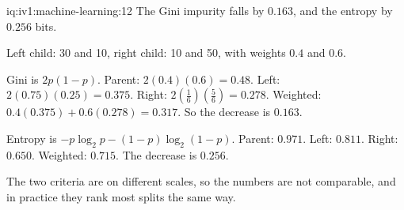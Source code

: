 \begin{solution}{iq:iv1:machine-learning:12}
The Gini impurity falls by $0.163$, and the entropy by $0.256$ bits.

Left child: 30 and 10, right child: 10 and 50, with weights $0.4$ and $0.6$.

Gini is $2p(1 - p)$. Parent: $2(0.4)(0.6) = 0.48$. Left: $2(0.75)(0.25) = 0.375$. Right: $2(\frac16)(\frac56) = 0.278$. Weighted: $0.4(0.375) + 0.6(0.278) = 0.317$. So the decrease is $0.163$.

Entropy is $-p\log_2 p - (1 - p)\log_2(1 - p)$. Parent: $0.971$. Left: $0.811$. Right: $0.650$. Weighted: $0.715$. The decrease is $0.256$.

The two criteria are on different scales, so the numbers are not comparable, and in practice they rank most splits the same way.



\end{solution}

